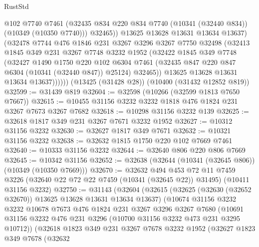 \begin{lexlean}{RustStd}
\begin{coremodule}
{\begin{coremodule}
{{{{{{{{{{{{{{{{{{{{{{{{{                  @102
                  @7740
                  @7461
                  (@32435 @834 @220 @834 @7740 (@10341 (@32440 @834)) (@10349 (@10350 @7740)))
                  @32465))
              @13625
              @13628
              @13631
              @13634
              @13637)
            (@32478
              @7744
              @476
              @1846
              @231
              @3267
              @3296
              @3267
              @7750
              @32498
              (@32413
                @1845
                @349
                @231
                @3267
                @7748
                @3232
                @1952
                (@32422
                  @1845
                  @349
                  @7748
                  (@32427
                    @1490
                    @1750
                    @220
                    @102
                    @6304
                    @7461
                    (@32435 @847 @220 @847 @6304 (@10341 (@32440 @847)) @25124)
                    @32465))
                @13625
                @13628
                @13631
                @13634
                @13637))))))
    (@13425 (@31428 @28))
    (@10400 (@31432 @12852 @819))
@32599 := @31439 @819
@32604 := @32598 (@10266 (@32599 @1813 @7650 @7667))
@32615 := @10455 @31156 @3232 @3232 @1818 @476 @1824 @231 @3267 @7673 @3267 @7682
@32618 := @10298 @31156 @3232 @139
@32625 := @32618 @1817 @349 @231 @3267 @7671 @3232 @1952
@32627 := @10312 @31156 @3232
@32630 := @32627 @1817 @349 @7671
@32632 := @10321 @31156 @3232
@32638 := @32632 @1815 @1750 @220 @102 @7669 @7461
@32640 := @10333 @31156 @3232
@32644 := @32640 @806 @220 @806 @7669
@32645 := @10342 @31156
@32652 := @32638 (@32644 (@10341 (@32645 @806)) (@10349 (@10350 @7669)))
@32670 := @32632
    @494
    @453
    @72
    @11
    @7459
    @3226
    (@32640 @22 @72 @22 @7459 (@10341 (@32645 @22)) @31495)
    (@10411 @31156 @3232)
@32750 := @31143
    (@32604
      (@32615
        (@32625 (@32630 (@32652 @32670)) @13625 @13628 @13631 @13634 @13637)
        (@10674
          @31156
          @3232
          @3232
          @10678
          @7673
          @476
          @1824
          @231
          @3267
          @3296
          @3267
          @7680
          (@10691 @31156 @3232 @476 @231 @3296 (@10700 @31156 @3232 @473 @231 @3295 @10712))
          (@32618
            @1823
            @349
            @231
            @3267
            @7678
            @3232
            @1952
            (@32627
              @1823
              @349
              @7678
              (@32632
}}}}}}}}}}}}}}}}}}}}}}}}}
\end{coremodule}}
\end{coremodule}
\end{lexlean}

